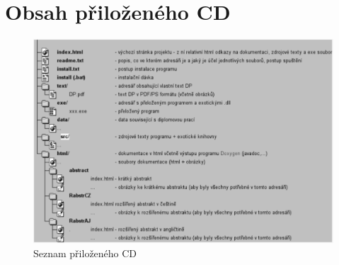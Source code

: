 \documentclass[11pt,twoside,a4paper]{book}
\begin{document}



\chapter{Obsah přiloženého CD}


\begin{figure}[h]
\begin{center}
\includegraphics[width=14cm]{figures/seznamcd}
\caption{Seznam přiloženého CD}
\label{fig:seznamcd}
\end{center}
\end{figure}
\end{document}
